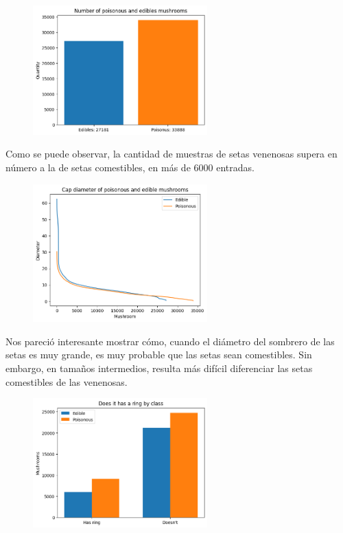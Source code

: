 \documentclass[11pt]{article}
\begin{document}
 \begin{figure}[H]
    \begin{center}
    \includegraphics[width=0.6\textwidth]{Results/Analysis/00EdiblesNumb.png}
    \end{center}
 \end{figure}
    Como se puede observar, la cantidad de muestras de setas venenosas supera en número a la de setas comestibles, en más de 6000 entradas.
 
 \begin{figure}[H]
    \begin{center}
    \includegraphics[width=0.6\textwidth]{Results/Analysis/01CapDiameter.png}
    \end{center}
 \end{figure}
	Nos pareció interesante mostrar cómo, cuando el diámetro del sombrero de las setas es muy grande, es muy probable que las setas sean comestibles. Sin embargo, en tamaños intermedios, resulta más difícil diferenciar las setas comestibles de las venenosas.

 \begin{figure}[H]
    \begin{center}
    \includegraphics[width=0.6\textwidth]{Results/Analysis/16HasRing.png}
    \end{center}
 \end{figure}
 
\end{document}

